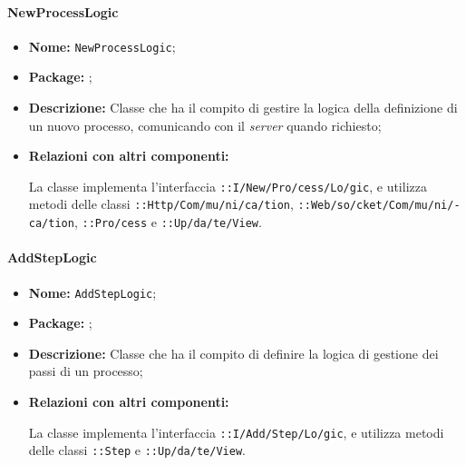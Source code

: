\paragraph{NewProcessLogic}
\begin{flushleft}
\begin{itemize}
\item \textbf{Nome:} \texttt{NewProcessLogic};
\item \textbf{Package:} \texttt{\logicAdmin{}};
\item \textbf{Descrizione:} Classe che ha il compito di gestire la logica della definizione di un nuovo processo, comunicando con il \textit{server} quando richiesto;
\item \textbf{Relazioni con altri componenti:}
\begin{sloppypar}
La classe implementa l'interfaccia \texttt{\iLogicAdmin{}::I\fshyp{}New\fshyp{}Pro\fshyp{}cess\fshyp{}Lo\fshyp{}gic}, e utilizza metodi delle classi \texttt{\serverCommunication{}::Http\fshyp{}Com\fshyp{}mu\fshyp{}ni\fshyp{}ca\fshyp{}tion}, \texttt{\serverCommunication{}::Web\fshyp{}so\fshyp{}cket\fshyp{}Com\fshyp{}mu\fshyp{}ni\fshyp{}ca\fshyp{}tion}, \texttt{\modelAdmin{}::Pro\fshyp{}cess} e \texttt{\logicAdmin{}::Up\fshyp{}da\fshyp{}te\fshyp{}View}.
\end{sloppypar}
\end{itemize}
\end{flushleft}

\paragraph{AddStepLogic}
\begin{flushleft}
\begin{itemize}
\item \textbf{Nome:} \texttt{AddStepLogic};
\item \textbf{Package:} \texttt{\logicAdmin{}};
\item \textbf{Descrizione:} Classe che ha il compito di definire la logica di gestione dei passi di un processo;
\item \textbf{Relazioni con altri componenti:}
\begin{sloppypar}
La classe implementa l'interfaccia \texttt{\iLogicAdmin{}::I\fshyp{}Add\fshyp{}Step\fshyp{}Lo\fshyp{}gic}, e utilizza metodi delle classi \texttt{\model{}::Step} e \texttt{\logicAdmin{}::Up\fshyp{}da\fshyp{}te\fshyp{}View}.
\end{sloppypar}
\end{itemize}
\end{flushleft}

